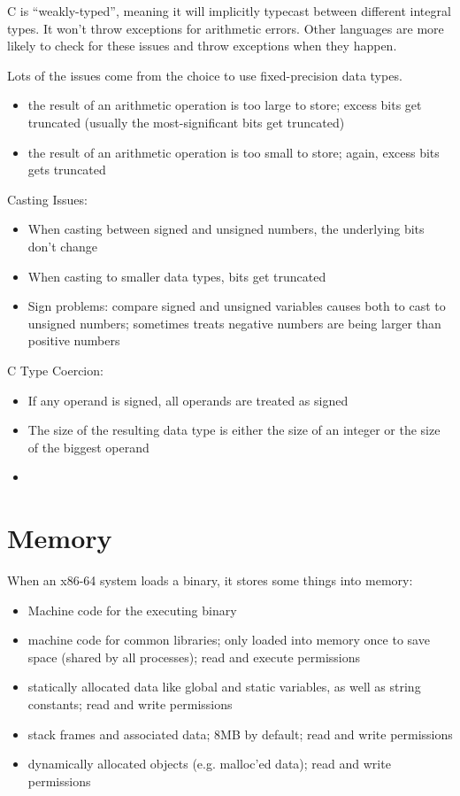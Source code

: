 \documentclass[code]{amznotes}
\begin{document}
C is ``weakly-typed'', meaning it will implicitly typecast between different integral types. It won't throw exceptions for arithmetic errors. Other languages are more likely to check for these issues and throw exceptions when they happen.

Lots of the issues come from the choice to use fixed-precision data types.
\begin{itemize}
    \item {} the result of an arithmetic operation is too large to store; excess bits get truncated (usually the most-significant bits get truncated)
    \item {} the result of an arithmetic operation is too small to store; again, excess bits gets truncated
\end{itemize}

Casting Issues:
\begin{itemize}
    \item When casting between signed and unsigned numbers, the underlying bits don't change
    \item When casting to smaller data types, bits get truncated
    \item Sign problems: compare signed and unsigned variables causes both to cast to unsigned numbers; sometimes treats negative numbers are being larger than positive numbers
\end{itemize}

C Type Coercion:
\begin{itemize}
    \item If any operand is signed, all operands are treated as signed
    \item The size of the resulting data type is either the size of an integer or the size of the biggest operand
    \item {}
\end{itemize}

\section{Memory}

When an x86-64 system loads a binary, it stores some things into memory:
\begin{itemize}
    \item {} Machine code for the executing binary
    \item {} machine code for common libraries; only loaded into memory once to save space (shared by all processes); read and execute permissions
    \item {} statically allocated data like global and static variables, as well as string constants; read and write permissions
    \item {} stack frames and associated data; 8MB by default; read and write permissions
    \item {} dynamically allocated objects (e.g. malloc'ed data); read and write permissions
\end{itemize}
\end{document}
